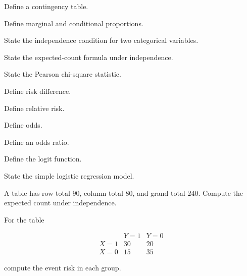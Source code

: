 \begin{exercise}[1]
Define a contingency table.
\end{exercise}

\begin{exercise}[1]
Define marginal and conditional proportions.
\end{exercise}

\begin{exercise}[1]
State the independence condition for two categorical variables.
\end{exercise}

\begin{exercise}[1]
State the expected-count formula under independence.
\end{exercise}

\begin{exercise}[1]
State the Pearson chi-square statistic.
\end{exercise}

\begin{exercise}[1]
Define risk difference.
\end{exercise}

\begin{exercise}[1]
Define relative risk.
\end{exercise}

\begin{exercise}[1]
Define odds.
\end{exercise}

\begin{exercise}[1]
Define an odds ratio.
\end{exercise}

\begin{exercise}[1]
Define the logit function.
\end{exercise}

\begin{exercise}[1]
State the simple logistic regression model.
\end{exercise}

\begin{exercise}[2]
A table has row total \(90\), column total \(80\), and grand total
\(240\). Compute the expected count under independence.
\end{exercise}

\begin{exercise}[2]
For the table

\[
\begin{array}{c|cc}
&
Y=1
&
Y=0
\\
\hline
X=1
&
30
&
20
\\
X=0
&
15
&
35
\end{array}
\]

compute the event risk in each group.
\end{exercise}

